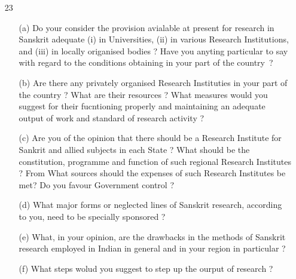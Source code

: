{\rm 
\begin{itemize}

   \item[23] \begin{itemize}
             \item[(a)] Do your consider the provision avialable at present for research in Sanskrit adequate (i) in Universities, (ii) in various Research Institutions, and (iii) in locally origanised bodies ? Have you anyting particular to say with regard to the conditions obtaining in your part of the country~?
             
             \item[(b)] Are there any privately organised Research Instituties in your part of the country ? What are their resources ? What measures would you suggest for their fucntioning properly and maintaining an adequate output of work and standard of research activity ?
   
              \item[(c)] Are you of the opinion that there should be a Research Institute for Sankrit and allied subjects in each State ? What should be the constitution, programme and function of such regional Research Institutes ? From What sources should the expenses of such Research Institutes be met? Do you favour Government  control ? 
              
              \item[(d)] What major forms or neglected lines of Sanskrit research, according to you, need to be specially sponsored ?
              
              \item[(e)] What, in your opinion, are the drawbacks in the methods of Sanskrit research employed in Indian in general and in your region in particular ? 
              
              \item[(f)] What steps wolud you suggest to step up the ourput of research ?
              \end{itemize}
\end{itemize}
}

